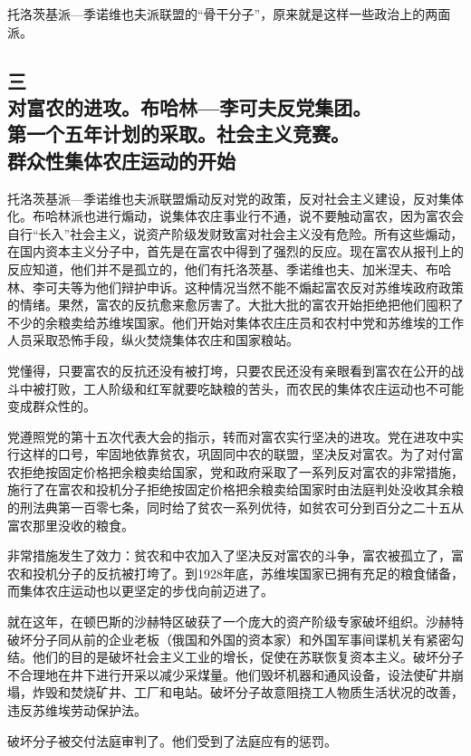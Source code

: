 托洛茨基派—季诺维也夫派联盟的“骨干分子”，原来就是这样一些政治上的两面派。


\subsection[三\q 对富农的进攻。布哈林—李可夫反党集团。第一个五年计划的采取。社会主义竞赛。群众性集体农庄运动的开始]{三\\对富农的进攻。布哈林—李可夫反党集团。\\第一个五年计划的采取。社会主义竞赛。\\群众性集体农庄运动的开始}

托洛茨基派—季诺维也夫派联盟煽动反对党的政策，反对社会主义建设，反对集体化。布哈林派也进行煽动，说集体农庄事业行不通，说不要触动富农，因为富农会自行“长入”社会主义，说资产阶级发财致富对社会主义没有危险。所有这些煽动，在国内资本主义分子中，首先是在富农中得到了强烈的反应。现在富农从报刊上的反应知道，他们并不是孤立的，他们有托洛茨基、季诺维也夫、加米涅夫、布哈林、李可夫等为他们辩护申诉。这种情况当然不能不煽起富农反对苏维埃政府政策的情绪。果然，富农的反抗愈来愈厉害了。大批大批的富农开始拒绝把他们囤积了不少的余粮卖给苏维埃国家。他们开始对集体农庄庄员和农村中党和苏维埃的工作人员采取恐怖手段，纵火焚烧集体农庄和国家粮站。

党懂得，只要富农的反抗还没有被打垮，只要农民还没有亲眼看到富农在公开的战斗中被打败，工人阶级和红军就要吃缺粮的苦头，而农民的集体农庄运动也不可能变成群众性的。

党遵照党的第十五次代表大会的指示，转而对富农实行坚决的进攻。党在进攻中实行这样的口号，牢固地依靠贫农，巩固同中农的联盟，坚决反对富农。为了对付富农拒绝按固定价格把余粮卖给国家，党和政府采取了一系列反对富农的非常措施，施行了在富农和投机分子拒绝按固定价格把余粮卖给国家时由法庭判处没收其余粮的刑法典第一百零七条，同时给了贫农一系列优待，如贫农可分到百分之二十五从富农那里没收的粮食。

非常措施发生了效力：贫农和中农加入了坚决反对富农的斗争，富农被孤立了，富农和投机分子的反抗被打垮了。到1928年底，苏维埃国家已拥有充足的粮食储备，而集体农庄运动也以更坚定的步伐向前迈进了。

就在这年，在顿巴斯的沙赫特区破获了一个庞大的资产阶级专家破坏组织。沙赫特破坏分子同从前的企业老板（俄国和外国的资本家）和外国军事间谍机关有紧密勾结。他们的目的是破坏社会主义工业的增长，促使在苏联恢复资本主义。破坏分子不合理地在井下进行开采以减少采煤量。他们毁坏机器和通风设备，设法使矿井崩塌，炸毁和焚烧矿井、工厂和电站。破坏分子故意阻挠工人物质生活状况的改善，违反苏维埃劳动保护法。

破坏分子被交付法庭审判了。他们受到了法庭应有的惩罚。

